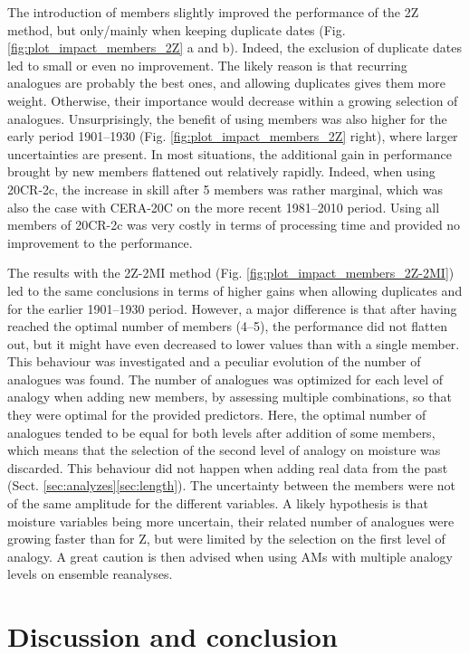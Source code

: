 \documentclass{ametsoc}
\begin{document}
The introduction of members slightly improved the performance of the 2Z method, but only/mainly when keeping duplicate dates (Fig. \ref{fig:plot_impact_members_2Z} a and b). Indeed, the exclusion of duplicate dates led to small or even no improvement. The likely reason is that recurring analogues are probably the best ones, and allowing duplicates gives them more weight. Otherwise, their importance would decrease within a growing selection of analogues. Unsurprisingly, the benefit of using members was also higher for the early period 1901--1930 (Fig. \ref{fig:plot_impact_members_2Z} right), where larger uncertainties are present. In most situations, the additional gain in performance brought by new members flattened out relatively rapidly. Indeed, when using 20CR-2c, the increase in skill after 5 members was rather marginal, which was also the case with CERA-20C on the more recent 1981--2010 period. Using all members of 20CR-2c was very costly in terms of processing time and provided no improvement to the performance. 

The results with the 2Z-2MI method (Fig. \ref{fig:plot_impact_members_2Z-2MI}) led to the same conclusions in terms of higher gains when allowing duplicates and for the earlier 1901--1930 period. However, a major difference is that after having reached the optimal number of members (4--5), the performance did not flatten out, but it might have even decreased to lower values than with a single member. This behaviour was investigated and a peculiar evolution of the number of analogues was found. The number of analogues was optimized for each level of analogy when adding new members, by assessing multiple combinations, so that they were optimal for the provided predictors. Here, the optimal number of analogues tended to be equal for both levels after addition of some members, which means that the selection of the second level of analogy on moisture was discarded. This behaviour did not happen when adding real data from the past (Sect. \ref{sec:analyzes}\ref{sec:length}). The uncertainty between the members were not of the same amplitude for the different variables. A likely hypothesis is that moisture variables being more uncertain, their related number of analogues were growing faster than for Z, but were limited by the selection on the first level of analogy. A great caution is then advised when using AMs with multiple analogy levels on ensemble reanalyses.


\section{Discussion and conclusion}
\label{sec:discussion-conclusion}
\end{document}
